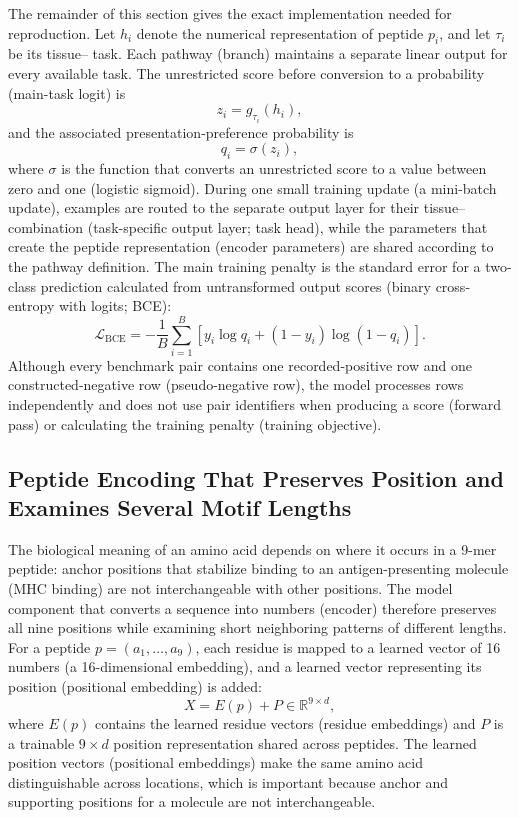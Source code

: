The remainder of this section gives the exact implementation needed for reproduction. Let \(h_i\) denote the numerical representation of peptide \(p_i\), and let \(\tau_i\) be its tissue--\plainHLA{} task. Each pathway (branch) maintains a separate linear output for every available task. The unrestricted score before conversion to a probability (main-task logit) is
\[
z_i=g_{\tau_i}(h_i),
\]
and the associated presentation-preference probability is
\[
q_i=\sigma(z_i),
\]
where \(\sigma\) is the function that converts an unrestricted score to a value between zero and one (logistic sigmoid). During one small training update (a mini-batch update), examples are routed to the separate output layer for their tissue--\plainHLA{} combination (task-specific output layer; task head), while the parameters that create the peptide representation (encoder parameters) are shared according to the pathway definition. The main training penalty is the standard error for a two-class prediction calculated from untransformed output scores (binary cross-entropy with logits; BCE):
\[
\mathcal{L}_{\mathrm{BCE}}
=
-\frac{1}{B}
\sum_{i=1}^{B}
\left[
y_i\log q_i+(1-y_i)\log(1-q_i)
\right].
\]
Although every benchmark pair contains one recorded-positive row and one constructed-negative row (pseudo-negative row), the model processes rows independently and does not use pair identifiers when producing a score (forward pass) or calculating the training penalty (training objective).

\subsection{Peptide Encoding That Preserves Position and Examines Several Motif Lengths}

The biological meaning of an amino acid depends on where it occurs in a 9-mer peptide: anchor positions that stabilize binding to an antigen-presenting molecule (MHC binding) are not interchangeable with other positions. The model component that converts a sequence into numbers (encoder) therefore preserves all nine positions while examining short neighboring patterns of different lengths. For a peptide \(p=(a_1,\ldots,a_9)\), each residue is mapped to a learned vector of 16 numbers (a 16-dimensional embedding), and a learned vector representing its position (positional embedding) is added:
\[
X=E(p)+P \in \mathbb{R}^{9\times d},
\]
where \(E(p)\) contains the learned residue vectors (residue embeddings) and \(P\) is a trainable \(9\times d\) position representation shared across peptides. The learned position vectors (positional embeddings) make the same amino acid distinguishable across locations, which is important because anchor and supporting positions for a \plainMHCI{} molecule are not interchangeable.

